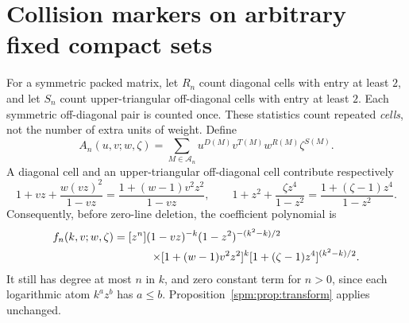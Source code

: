 \section{Collision markers on arbitrary fixed compact sets}\label{spm:sec:collision}
For a symmetric packed matrix, let $R_n$ count diagonal cells with entry at least $2$, and let $S_n$ count upper-triangular off-diagonal cells with entry at least $2$. Each symmetric off-diagonal pair is counted once. These statistics count repeated \emph{cells}, not the number of extra units of weight. Define
\[
 A_n(u,v;w,\zeta)=\sum_{M\in\mathcal A_n}
 u^{D(M)}v^{T(M)}w^{R(M)}\zeta^{S(M)}.
\]
A diagonal cell and an upper-triangular off-diagonal cell contribute respectively
\[
 1+vz+\frac{w(vz)^2}{1-vz}
   =\frac{1+(w-1)v^2z^2}{1-vz},\qquad
 1+z^2+\frac{\zeta z^4}{1-z^2}
   =\frac{1+(\zeta-1)z^4}{1-z^2}.
\]
Consequently, before zero-line deletion, the coefficient polynomial is
\begin{align}\label{spm:eq:collision-fn}
 f_n(k,v;w,\zeta)=[z^n]{}&(1-vz)^{-k}(1-z^2)^{-(k^2-k)/2}\notag\\
 &\mathrel{}\times[1+(w-1)v^2z^2]^k
 [1+(\zeta-1)z^4]^{(k^2-k)/2}.
\end{align}
It still has degree at most $n$ in $k$, and zero constant term for $n>0$, since each logarithmic atom $k^az^b$ has $a\leq b$. Proposition~\ref{spm:prop:transform} applies unchanged.

